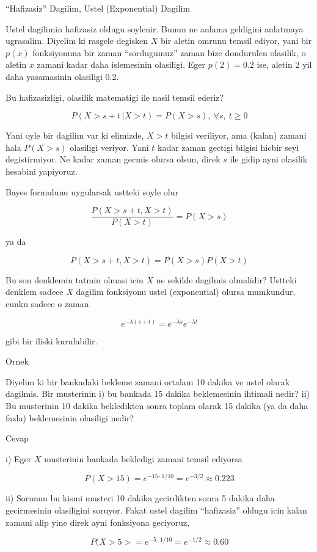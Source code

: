 \documentclass[12pt,fleqn]{article}
\begin{document}
``Hafizasiz'' Dagilim, Ustel (Exponential) Dagilim

Ustel dagilimin hafizasiz oldugu soylenir. Bunun ne anlama geldigini
anlatmaya ugrasalim. Diyelim ki rasgele degisken $X$ bir aletin omrunu
temsil ediyor, yani bir $p(x)$ fonksiyonuna bir zaman ``sordugumuz'' zaman
bize dondurulen olasilik, o aletin $x$ zamani kadar daha islemesinin
olasiligi. Eger $p(2) = 0.2$ ise, aletin 2 yil daha yasamasinin olasiligi
0.2. 

Bu hafizasizligi, olasilik matematigi ile nasil temsil ederiz?

\[ P( X>s+t \ | X>t ) =  P(X>s) , \ \forall s, \ t \ge 0 \]

Yani oyle bir dagilim var ki elimizde, $X>t$ bilgisi veriliyor, ama (kalan)
zamani hala $P(X>s)$ olasiligi veriyor. Yani $t$ kadar zaman gectigi 
bilgisi hicbir seyi degistirmiyor. Ne kadar zaman gecmis olursa olsun,
direk $s$ ile gidip ayni olasilik hesabini yapiyoruz. 

Bayes formulunu uygularsak ustteki soyle olur

\[  \frac{P( X>s+t,  X>t )}{P(X>t)} = P(X>s)  \]


ya da

\[  P( X>s+t,  X>t ) = P(X>s)P(X>t) \]

Bu son denklemin tatmin olmasi icin $X$ ne sekilde dagilmis olmalidir?
Ustteki denklem sadece $X$ dagilim fonksiyonu ustel (exponential) olursa
mumkundur, cunku sadece o zaman

\[ e^{-\lambda(s+t)}  = e^{-\lambda s} e^{-\lambda t}\]

gibi bir iliski kurulabilir. 

Ornek

Diyelim ki bir bankadaki bekleme zamani ortalam 10 dakika ve ustel olarak
dagilmis. Bir musterinin i) bu bankada 15 dakika beklemesinin ihtimali
nedir? ii) Bu musterinin 10 dakika bekledikten sonra toplam olarak 15
dakika (ya da daha fazla) beklemesinin olasiligi nedir? 

Cevap

i) Eger $X$ musterinin bankada bekledigi zamani temsil ediyorsa

\[ P(X>15) = e^{-15 \cdot 1/10} = e^{-3/2} \approx 0.223 \]

ii) Sorunun bu kismi musteri 10 dakika gecirdikten sonra 5 dakika daha
gecirmesinin olasiligini soruyor. Fakat ustel dagilim ``hafizasiz'' oldugu
icin kalan zamani alip yine direk ayni fonksiyona geciyoruz, 

\[ P(X>5> = e^{-5 \cdot 1/10} = e^{-1/2} \approx 0.60\]
\end{document}
